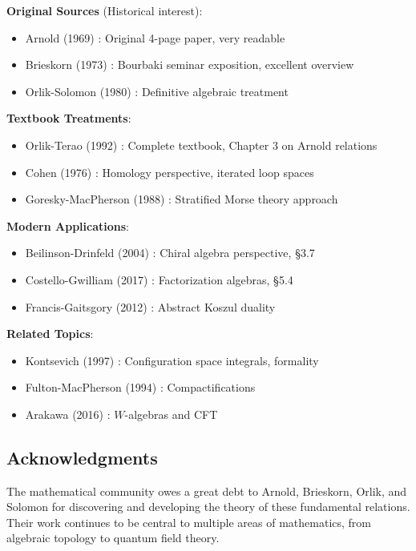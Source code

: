 \begin{reading}
\textbf{Original Sources} (Historical interest):
\begin{itemize}
\item Arnold (1969) \cite{Arnold69}: Original 4-page paper, very readable
\item Brieskorn (1973) \cite{Brieskorn73}: Bourbaki seminar exposition, excellent overview
\item Orlik-Solomon (1980) \cite{OrlikSolomon80}: Definitive algebraic treatment
\end{itemize}

\textbf{Textbook Treatments}:
\begin{itemize}
\item Orlik-Terao (1992) \cite{OrlikTerao92}: Complete textbook, Chapter 3 on Arnold relations
\item Cohen (1976) \cite{Cohen76}: Homology perspective, iterated loop spaces
\item Goresky-MacPherson (1988) \cite{GoMa92}: Stratified Morse theory approach
\end{itemize}

\textbf{Modern Applications}:
\begin{itemize}
\item Beilinson-Drinfeld (2004) \cite{BD04}: Chiral algebra perspective, §3.7
\item Costello-Gwilliam (2017) \cite{CG17}: Factorization algebras, §5.4
\item Francis-Gaitsgory (2012) \cite{FG-factorization}: Abstract Koszul duality
\end{itemize}

\textbf{Related Topics}:
\begin{itemize}
\item Kontsevich (1997) \cite{Kontsevich97}: Configuration space integrals, formality
\item Fulton-MacPherson (1994) \cite{FultonMacPherson94}: Compactifications
\item Arakawa (2016) \cite{Arakawa-W-algebras}: $W$-algebras and CFT
\end{itemize}
\end{reading}

\subsection{Acknowledgments}

The mathematical community owes a great debt to Arnold, Brieskorn, Orlik, and Solomon 
for discovering and developing the theory of these fundamental relations. Their work 
continues to be central to multiple areas of mathematics, from algebraic topology to 
quantum field theory.

